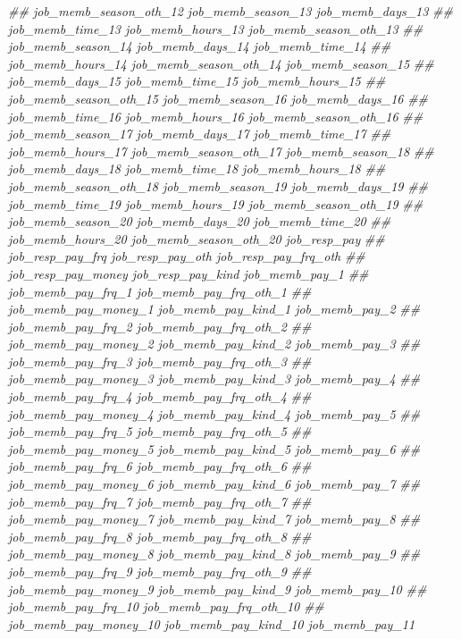 \documentclass[
]{article}
\newenvironment{Shaded}{\begin{snugshade}}{\end{snugshade}}
\newcommand{\CommentTok}[1]{\textcolor[rgb]{0.56,0.35,0.01}{\textit{#1}}}
\begin{document}
\begin{Shaded}
\begin{Highlighting}[]
\CommentTok{##      job_memb_season_oth_12 job_memb_season_13 job_memb_days_13}
\CommentTok{##      job_memb_time_13 job_memb_hours_13 job_memb_season_oth_13}
\CommentTok{##      job_memb_season_14 job_memb_days_14 job_memb_time_14}
\CommentTok{##      job_memb_hours_14 job_memb_season_oth_14 job_memb_season_15}
\CommentTok{##      job_memb_days_15 job_memb_time_15 job_memb_hours_15}
\CommentTok{##      job_memb_season_oth_15 job_memb_season_16 job_memb_days_16}
\CommentTok{##      job_memb_time_16 job_memb_hours_16 job_memb_season_oth_16}
\CommentTok{##      job_memb_season_17 job_memb_days_17 job_memb_time_17}
\CommentTok{##      job_memb_hours_17 job_memb_season_oth_17 job_memb_season_18}
\CommentTok{##      job_memb_days_18 job_memb_time_18 job_memb_hours_18}
\CommentTok{##      job_memb_season_oth_18 job_memb_season_19 job_memb_days_19}
\CommentTok{##      job_memb_time_19 job_memb_hours_19 job_memb_season_oth_19}
\CommentTok{##      job_memb_season_20 job_memb_days_20 job_memb_time_20}
\CommentTok{##      job_memb_hours_20 job_memb_season_oth_20 job_resp_pay}
\CommentTok{##      job_resp_pay_frq job_resp_pay_oth job_resp_pay_frq_oth}
\CommentTok{##      job_resp_pay_money job_resp_pay_kind job_memb_pay_1}
\CommentTok{##      job_memb_pay_frq_1 job_memb_pay_frq_oth_1}
\CommentTok{##      job_memb_pay_money_1 job_memb_pay_kind_1 job_memb_pay_2}
\CommentTok{##      job_memb_pay_frq_2 job_memb_pay_frq_oth_2}
\CommentTok{##      job_memb_pay_money_2 job_memb_pay_kind_2 job_memb_pay_3}
\CommentTok{##      job_memb_pay_frq_3 job_memb_pay_frq_oth_3}
\CommentTok{##      job_memb_pay_money_3 job_memb_pay_kind_3 job_memb_pay_4}
\CommentTok{##      job_memb_pay_frq_4 job_memb_pay_frq_oth_4}
\CommentTok{##      job_memb_pay_money_4 job_memb_pay_kind_4 job_memb_pay_5}
\CommentTok{##      job_memb_pay_frq_5 job_memb_pay_frq_oth_5}
\CommentTok{##      job_memb_pay_money_5 job_memb_pay_kind_5 job_memb_pay_6}
\CommentTok{##      job_memb_pay_frq_6 job_memb_pay_frq_oth_6}
\CommentTok{##      job_memb_pay_money_6 job_memb_pay_kind_6 job_memb_pay_7}
\CommentTok{##      job_memb_pay_frq_7 job_memb_pay_frq_oth_7}
\CommentTok{##      job_memb_pay_money_7 job_memb_pay_kind_7 job_memb_pay_8}
\CommentTok{##      job_memb_pay_frq_8 job_memb_pay_frq_oth_8}
\CommentTok{##      job_memb_pay_money_8 job_memb_pay_kind_8 job_memb_pay_9}
\CommentTok{##      job_memb_pay_frq_9 job_memb_pay_frq_oth_9}
\CommentTok{##      job_memb_pay_money_9 job_memb_pay_kind_9 job_memb_pay_10}
\CommentTok{##      job_memb_pay_frq_10 job_memb_pay_frq_oth_10}
\CommentTok{##      job_memb_pay_money_10 job_memb_pay_kind_10 job_memb_pay_11}

\end{Highlighting}
\end{Shaded}
\end{document}

